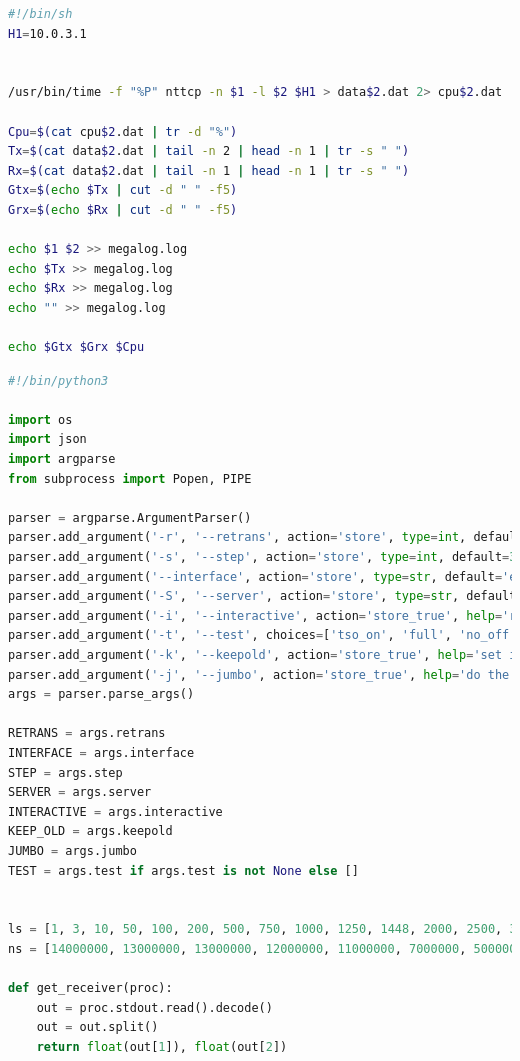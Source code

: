 \documentclass{exam}
\begin{document}
\begin{lstlisting}[language=bash]
#!/bin/sh
H1=10.0.3.1


/usr/bin/time -f "%P" nttcp -n $1 -l $2 $H1 > data$2.dat 2> cpu$2.dat

Cpu=$(cat cpu$2.dat | tr -d "%")
Tx=$(cat data$2.dat | tail -n 2 | head -n 1 | tr -s " ")
Rx=$(cat data$2.dat | tail -n 1 | head -n 1 | tr -s " ")
Gtx=$(echo $Tx | cut -d " " -f5)
Grx=$(echo $Rx | cut -d " " -f5)

echo $1 $2 >> megalog.log
echo $Tx >> megalog.log
echo $Rx >> megalog.log
echo "" >> megalog.log

echo $Gtx $Grx $Cpu
\end{lstlisting}
\begin{lstlisting}[language=python]
#!/bin/python3

import os
import json
import argparse
from subprocess import Popen, PIPE

parser = argparse.ArgumentParser()
parser.add_argument('-r', '--retrans', action='store', type=int, default=5, help='number of retransmissions')
parser.add_argument('-s', '--step', action='store', type=int, default=300, help='number of steps to reach 3000 bytes')
parser.add_argument('--interface', action='store', type=str, default='eth0', help='interface to modify the offloading')
parser.add_argument('-S', '--server', action='store', type=str, default='10.0.3.1', help='server to connect')
parser.add_argument('-i', '--interactive', action='store_true', help='run gnuplot in interactive mode')
parser.add_argument('-t', '--test', choices=['tso_on', 'full', 'no_off', 'stressed', 'jumbo', 'jumbo_long'], nargs='+', help='test for different modes')
parser.add_argument('-k', '--keepold', action='store_true', help='set if you want to don\'t override old files')
parser.add_argument('-j', '--jumbo', action='store_true', help='do the jumbo test')
args = parser.parse_args()

RETRANS = args.retrans
INTERFACE = args.interface
STEP = args.step
SERVER = args.server
INTERACTIVE = args.interactive
KEEP_OLD = args.keepold
JUMBO = args.jumbo
TEST = args.test if args.test is not None else []


ls = [1, 3, 10, 50, 100, 200, 500, 750, 1000, 1250, 1448, 2000, 2500, 3000]
ns = [14000000, 13000000, 13000000, 12000000, 11000000, 7000000, 5000000, 4000000, 3000000, 2500000, 2000000, 1500000]

def get_receiver(proc):
    out = proc.stdout.read().decode()
    out = out.split()
    return float(out[1]), float(out[2])


\end{lstlisting}
\end{document}
